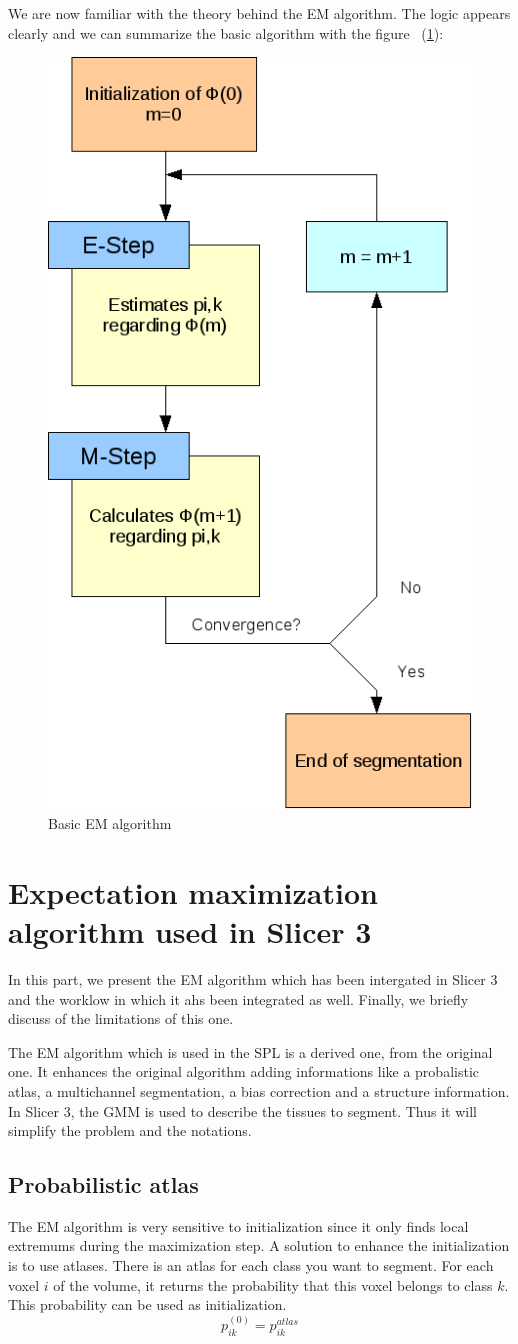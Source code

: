  
  \par
  We are now familiar with the theory behind the EM algorithm. The logic appears clearly and we can summarize the basic algorithm with the figure ~(\ref{fig:EMAlgorithm}):
   
  \begin{figure}[ht]\centering
  \includegraphics[width=.4\textwidth]{Images/Graphics/EMSimple.png}
  \caption{Basic EM algorithm}\label{fig:EMAlgorithm}
  \end{figure}

\section{Expectation maximization algorithm used in Slicer 3}\label{angels}
In this part, we present the EM algorithm which has been intergated in Slicer 3 and the worklow in which it ahs been integrated as well. Finally, we briefly discuss of the limitations of this one.
\par
The EM algorithm which is used in the SPL is a derived one, from the original one. It enhances the original algorithm adding informations like a probalistic atlas, a multichannel segmentation, a bias correction and a structure information. In Slicer 3, the GMM is used to describe the tissues to segment. Thus it will simplify the problem and the notations.
%
\subsection{Probabilistic atlas}\label{spatial}
The EM algorithm is very sensitive to initialization since it only finds local extremums during the maximization step. A solution to enhance the initialization is to use atlases. There is an atlas for each class you want to segment. For each voxel $i$ of the volume, it returns the probability that this voxel belongs to class $k$. This probability can be used as initialization.
  \begin{equation*}
  p_{ik}^{(0)} = p_{ik}^{atlas}
  \end{equation*}   

